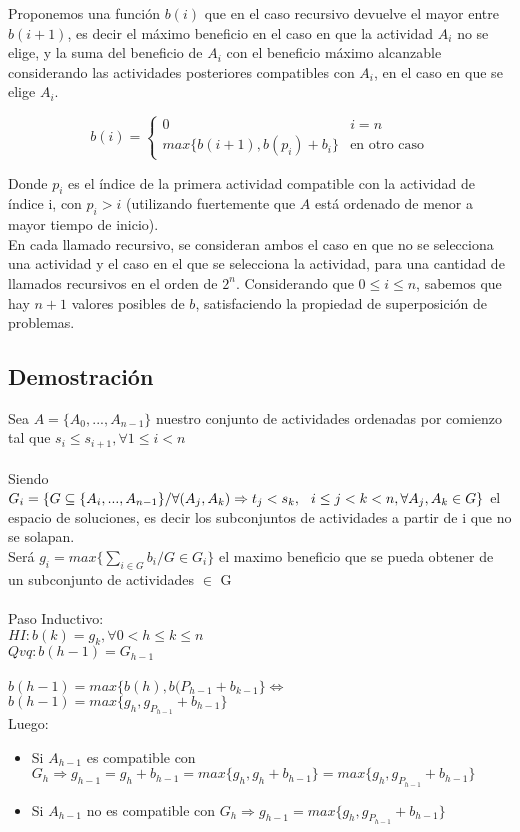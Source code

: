 \documentclass[10pt, a4paper]{article}
\begin{document}
Proponemos una función $b(i)$ que en el caso recursivo devuelve el mayor entre $b(i+1)$, es decir el máximo beneficio en el caso en que la actividad $A_i$ no se elige, y la suma del beneficio de $A_i$ con el beneficio máximo alcanzable considerando las actividades posteriores compatibles con $A_i$, en el caso en que se elige $A_i$.

$$b(i) = \begin{cases}
    0 & i = n \\
    max\{b(i+1), b(p_i) + b_i\} & \text{en otro caso}
\end{cases}$$

Donde $p_i$ es el índice de la primera actividad compatible con la actividad de índice i, con $p_i > i$ (utilizando fuertemente que $A$ está ordenado de menor a mayor tiempo de inicio). \\

En cada llamado recursivo, se consideran ambos el caso en que no se selecciona una actividad y el caso en el que se selecciona la actividad, para una cantidad de llamados recursivos en el orden de $2^n$. Considerando que $0 \leq i \leq n$, sabemos que hay $n+1$ valores posibles de $b$, satisfaciendo la propiedad de superposición de problemas.

\subsection{Demostración}
Sea $A = \{A_0, ... , A_{n-1}\}$ nuestro conjunto de actividades ordenadas por comienzo tal que $s_i \leq s_{i+1},  \forall  1 \leq i < n$ \\ \\
Siendo $G_i = \{G \subseteq \{ A_i, ..., A_{n-1} \} / \forall (A_j, A_k) \Rightarrow t_j < s_k, \hspace{0.25cm} i \leq j < k < n, \forall A_j, A_k \in G \}$ el espacio de soluciones, es decir los subconjuntos de actividades a partir de i que no se solapan.
\\
Será $g_i = max \{ \sum_{i \in G } b_i / G \in G_i\}$ el maximo beneficio que se pueda obtener de un subconjunto de actividades $\in$ G
\\ \\ 
Paso Inductivo:\\
$HI: b(k) = g_k, \forall 0 < h \leq k \leq n$\\
$Qvq: b(h-1) = G_{h-1}$
\\ \\
$b(h-1) = max \{b(h), b(P_{h-1} + b_{k-1} \} \Leftrightarrow$
\\
$b(h-1) = max \{g_h, g_{P_{h-1}} + b_{h-1} \}$
\\ Luego:
\begin{itemize}
    \item Si $A_{h-1}$ es compatible con $G_h \Rightarrow g_{h-1} = g_h + b_{h-1} = max\{g_h, g_h + b_{h-1}\} = max\{g_h, g_{P_{h-1}} + b_{h-1}\}$
    \item Si $A_{h-1}$ no es compatible con $G_h \Rightarrow g_{h-1} = max\{g_h, g_{P_{h-1}} + b_{h-1}\}$
\end{itemize}
\end{document}
